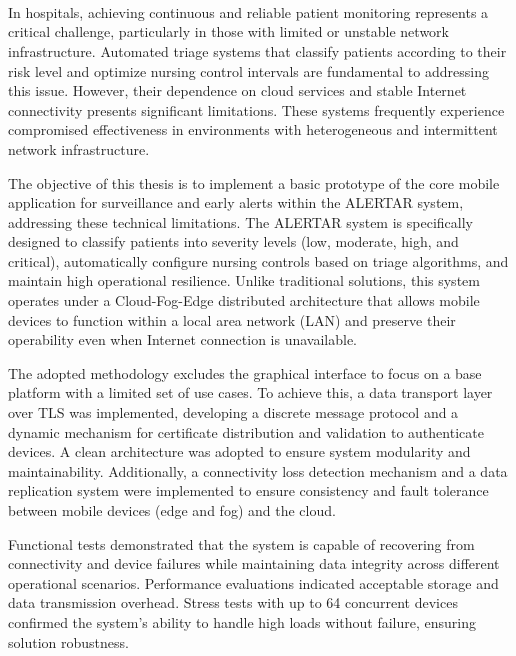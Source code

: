 \ \\
\ \\
\label{pagsumm}
\\
\ \\
\ \\

\ \\

\ \\
\ \\
In hospitals, achieving continuous and reliable patient monitoring represents a critical challenge, particularly in those with limited or unstable network infrastructure. Automated triage systems that classify patients according to their risk level and optimize nursing control intervals are fundamental to addressing this issue. However, their dependence on cloud services and stable Internet connectivity presents significant limitations. These systems frequently experience compromised effectiveness in environments with heterogeneous and intermittent network infrastructure.

The objective of this thesis is to implement a basic prototype of the core mobile application for surveillance and early alerts within the ALERTAR system, addressing these technical limitations. The ALERTAR system is specifically designed to classify patients into severity levels (low, moderate, high, and critical), automatically configure nursing controls based on triage algorithms, and maintain high operational resilience. Unlike traditional solutions, this system operates under a Cloud-Fog-Edge distributed architecture that allows mobile devices to function within a local area network (LAN) and preserve their operability even when Internet connection is unavailable.

The adopted methodology excludes the graphical interface to focus on a base platform with a limited set of use cases. To achieve this, a data transport layer over TLS was implemented, developing a discrete message protocol and a dynamic mechanism for certificate distribution and validation to authenticate devices. A clean architecture was adopted to ensure system modularity and maintainability. Additionally, a connectivity loss detection mechanism and a data replication system were implemented to ensure consistency and fault tolerance between mobile devices (edge and fog) and the cloud.

Functional tests demonstrated that the system is capable of recovering from connectivity and device failures while maintaining data integrity across different operational scenarios. Performance evaluations indicated acceptable storage and data transmission overhead. Stress tests with up to 64 concurrent devices confirmed the system's ability to handle high loads without failure, ensuring solution robustness.

